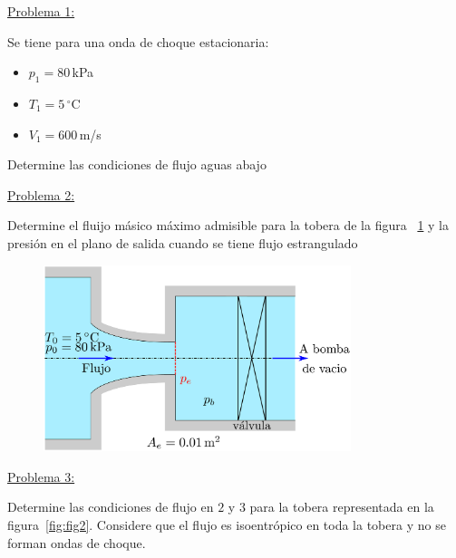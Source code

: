 \documentclass[11pt]{report}
\begin{document}

\vspace{1cm}


\vspace{1cm}

\underline {Problema 1:}
\vspace{0.2cm}

Se tiene para una onda de choque estacionaria:
\begin{itemize}
\item $p_1=80$\,kPa
\item $T_1=5$\,$^\circ$C
\item $V_1=600$\,m/s
\end{itemize}
Determine las condiciones de flujo aguas abajo
\vspace{0.5cm}

\underline {Problema 2:}
\vspace{0.2cm}

Determine el fluijo m\'asico m\'aximo admisible para la tobera de la figura ~\ref{fig:fig1} y la presi\'on en el plano de salida cuando se tiene flujo estrangulado
\begin{figure}[H]
\centering\includegraphics[width=0.8\textwidth]{Figures/tobera_conv.eps}
\caption{\label{fig:fig1} }
\end{figure}

\newpage

\underline {Problema 3:}
\vspace{0.2cm}

Determine las condiciones de flujo en $2$ y $3$ para la tobera representada en la figura~\ref{fig:fig2}. Considere que el flujo es isoentr\'opico en toda la tobera y no se forman ondas de choque.
\end{document}
